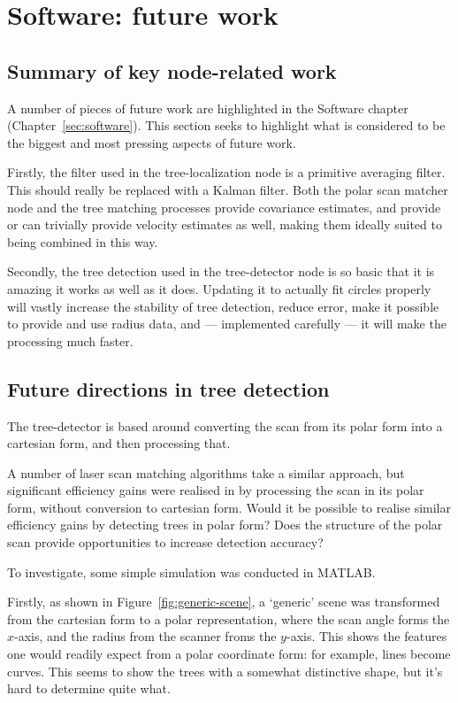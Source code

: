 \documentclass[12pt,oneside,a4paper]{book}
\begin{document}
\section{Software: future work}
\label{sec:softw-future-work}

\subsection{Summary of key node-related work}
\label{sec:summary-key-node}

A number of pieces of future work are highlighted in the Software
chapter (Chapter~\ref{sec:software}). This section seeks to highlight
what is considered to be the biggest and most pressing aspects of
future work.

Firstly, the filter used in the tree-localization node is a primitive
averaging filter. This should really be replaced with a Kalman
filter. Both the polar scan matcher node and the tree matching
processes provide covariance estimates, and provide or can trivially
provide velocity estimates as well, making them ideally suited to
being combined in this way.

Secondly, the tree detection used in the tree-detector node is so
basic that it is amazing it works as well as it does. Updating it to
actually fit circles properly will vastly increase the stability of
tree detection, reduce error, make it possible to provide and use
radius data, and --- implemented carefully --- it will make the
processing much faster.
\newpage
\subsection{Future directions in tree detection}
\label{sec:future-direct-tree}

The tree-detector is based around converting the scan from its polar
form into a cartesian form, and then processing that.

A number of laser scan matching algorithms take a similar approach,
but significant efficiency gains were realised in
\cite{polarscanmatching} by processing the scan in its polar form,
without conversion to cartesian form. Would it be possible to realise
similar efficiency gains by detecting trees in polar form? Does the
structure of the polar scan provide opportunities to increase
detection accuracy?

To investigate, some simple simulation was conducted in MATLAB. 

Firstly, as shown in Figure~\ref{fig:generic-scene}, a `generic' scene
was transformed from the cartesian form to a polar representation,
where the scan angle forms the $x$-axis, and the radius from the
scanner froms the $y$-axis. This shows the features one would readily
expect from a polar coordinate form: for example, lines become
curves. This seems to show the trees with a somewhat distinctive
shape, but it's hard to determine quite what.
\end{document}
